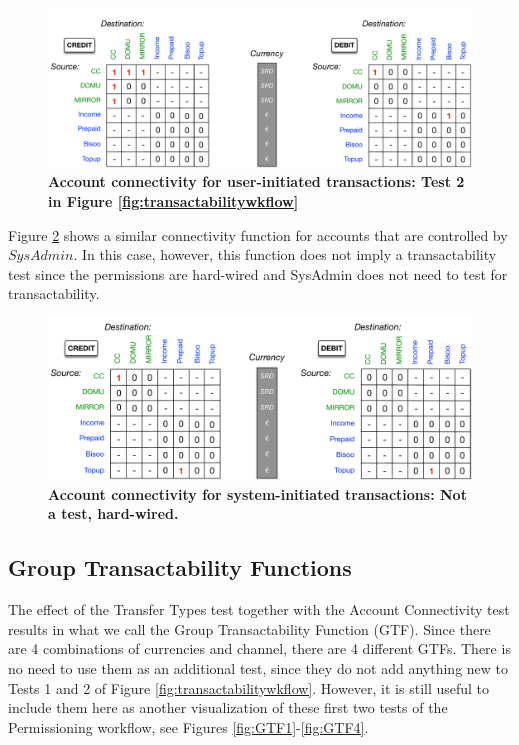 \begin{figure}[H]
\centering
\includegraphics[width=17cm]{Figures/User_Acct_Connectivity}
\caption{\small\textbf{Account connectivity for user-initiated transactions: Test 2 in Figure \ref{fig:transactabilitywkflow}}}
\label{fig:User_Acct_Connectivity}
\end{figure}

Figure \ref{fig:SysAdmin_Acct_Connectivity} shows a similar connectivity function for accounts that are controlled by $SysAdmin$. In this case, however, this function does not imply a transactability test since the permissions are hard-wired and SysAdmin does not need to test for transactability.

\begin{figure}[htbp]
\centering
\includegraphics[width=17cm]{Figures/SysAdmin_Acct_Connectivity}
\caption{\small\textbf{Account connectivity for system-initiated transactions: Not a test, hard-wired. }}
\label{fig:SysAdmin_Acct_Connectivity}
\end{figure}

\subsection{Group Transactability Functions}
The effect of the Transfer Types test together with the Account Connectivity test results in what we call the Group Transactability Function (GTF). Since there are 4 combinations of currencies and channel, there are 4 different GTFs. There is no need to use them as an additional test, since they do not add anything new to Tests 1 and 2 of Figure \ref{fig:transactabilitywkflow}. However, it is still useful to include them here as another visualization of these first two tests of the Permissioning workflow, see Figures \ref{fig:GTF1}-\ref{fig:GTF4}.

